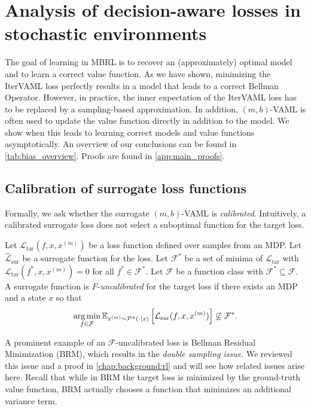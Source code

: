 \section{Analysis of decision-aware losses in stochastic environments}
\label{sec:theory_1}
The goal of learning in MBRL is to recover an (approximately) optimal model and to learn a correct value function.
As we have shown, minimizing the IterVAML loss perfectly results in a model that leads to a correct Bellman Operator.
However, in practice, the inner expectation of the IterVAML loss has to be replaced by a sampling-based approximation.
In addition, $(m,b)$-VAML is often used to update the value function directly in addition to the model.
We show when this leads to learning correct models and value functions asymptotically.
An overview of our conclusions can be found in \autoref{tab:bias_overview}.
Proofs are found in \autoref{app:main_proofs}.
\subsection{Calibration of surrogate loss functions}

Formally, we ask whether the surrogate $(m,b)$-VAML is \emph{calibrated}.
Intuitively, a calibrated surrogate loss does not select a suboptimal function for the target loss.
\begin{definition}
    Let $\mathcal{L}_\mathrm{tar}(f,x,x^{(m)})$ be a loss function defined over samples from an MDP.
    Let $\hat{\mathcal{L}}_\mathrm{sur}$ be a surrogate function for the loss.
    Let $\mathcal{F}^*$ be a set of minima of $\mathcal{L}_\mathrm{tar}$ with $\mathcal{L}_\mathrm{tar}(f^*,x,x^{(m)}) = 0$ for all $f^* \in \mathcal{F}^*.$
    Let $\mathcal{F}$ be a function class with $\mathcal{F}^* \subseteq \mathcal{F}$.
    A surrogate function is $F$-\emph{uncalibrated} for the target loss if there exists an MDP and a state $x$ so that 
    $$\operatorname*{arg\,min}_{f \in \mathcal{F}} \mathbb{E}_{x^{(m)}\sim\mathcal{P}^\pi(\cdot|x)}\left[\mathcal{L}_\mathrm{sur}(f,x,x^{(m)})\right] \not\subseteq \mathcal{F}^*.$$
\end{definition}
%
A prominent example of an $\mathcal{F}$-uncalibrated loss is Bellman Residual Minimization (BRM), which results in the \emph{double sampling issue}.
We reviewed this issue and a proof in \autoref{chap:background:rl} and will see how related issues arise here.
Recall that while in BRM the target loss is minimized by the ground-truth value function, BRM actually chooses a function that minimizes an additional variance term.

